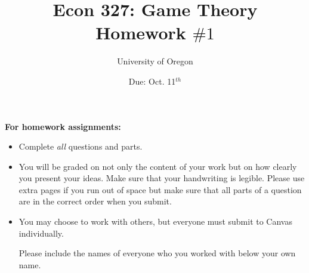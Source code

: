 \documentclass[addpoints]{exam}
\title{
    \textbf{Econ 327: Game Theory} \\ 
    Homework $\#1$
    }
\author{University of Oregon}
\date{Due: Oct. 11$^{th}$}
\begin{document}
\maketitle

\begin{center}
  \gradetable[h][questions]
\end{center}

\vspace{0.5in}

\begin{center}
  \textbf{For homework assignments:}
\end{center}

\begin{itemize}


  \item Complete \textit{all} questions and parts.


  \item You will be graded on not only the content of your work
    but on how clearly you present your ideas.
    Make sure that your handwriting is legible.
    Please use extra pages if you run out of space 
    but make sure that all parts of a question 
    are in the correct order when you submit.

  \item You may choose to work with others,
  but everyone must submit to Canvas individually.

  Please include the names of everyone who you worked with 
  below your own name.
 
\end{itemize}

\vspace{1.0in}


\vspace{0.5in}

\end{document}
